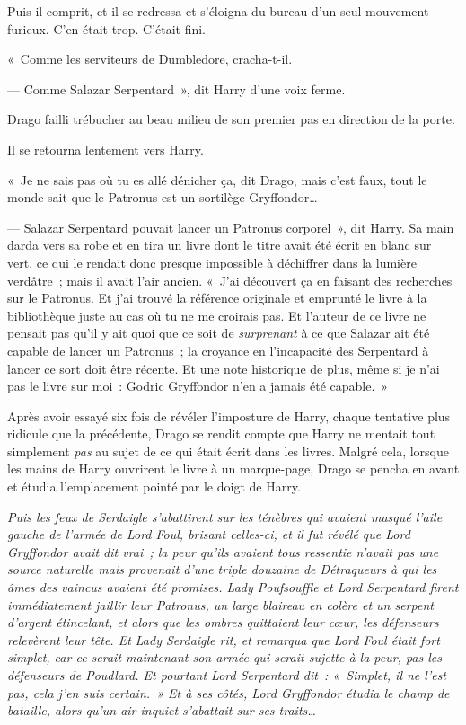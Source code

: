 Puis il comprit, et il se redressa et s'éloigna du bureau d'un seul mouvement furieux.
C'en était trop.
C'était fini.

«~Comme les serviteurs de Dumbledore, cracha-t-il.

--- Comme Salazar Serpentard~», dit Harry d'une voix ferme.

Drago failli trébucher au beau milieu de son premier pas en direction de la porte.

Il se retourna lentement vers Harry.

«~Je ne sais pas où tu es allé dénicher ça, dit Drago, mais c'est faux, tout le monde sait que le Patronus est un sortilège Gryffondor…

--- Salazar Serpentard pouvait lancer un Patronus corporel~», dit Harry.
Sa main darda vers sa robe et en tira un livre dont le titre avait été écrit en blanc sur vert, ce qui le rendait donc presque impossible à déchiffrer dans la lumière verdâtre~; mais il avait l'air ancien.
«~J'ai découvert ça en faisant des recherches sur le Patronus.
Et j'ai trouvé la référence originale et emprunté le livre à la bibliothèque juste au cas où tu ne me croirais pas.
Et l'auteur de ce livre ne pensait pas qu'il y ait quoi que ce soit de \emph{surprenant} à ce que Salazar ait été capable de lancer un Patronus~; la croyance en l'incapacité des Serpentard à lancer ce sort doit être récente.
Et une note historique de plus, même si je n'ai pas le livre sur moi~: Godric Gryffondor n'en a jamais été capable.~»

Après avoir essayé six fois de révéler l'imposture de Harry, chaque tentative plus ridicule que la précédente, Drago se rendit compte que Harry ne mentait tout simplement \emph{pas} au sujet de ce qui était écrit dans les livres.
Malgré cela, lorsque les mains de Harry ouvrirent le livre à un marque-page, Drago se pencha en avant et étudia l'emplacement pointé par le doigt de Harry.

\emph{Puis les feux de Serdaigle s'abattirent sur les ténèbres qui avaient masqué l'aile gauche de l'armée de Lord Foul, brisant celles-ci, et il fut révélé que Lord Gryffondor avait dit vrai~; la peur qu'ils avaient tous ressentie n'avait pas une source naturelle mais provenait d'une triple douzaine de Détraqueurs à qui les âmes des vaincus avaient été promises.
Lady Poufsouffle et Lord Serpentard firent immédiatement jaillir leur Patronus, un large blaireau en colère et un serpent d'argent étincelant, et alors que les ombres quittaient leur cœur, les défenseurs relevèrent leur tête.
Et Lady Serdaigle rit, et remarqua que Lord Foul était fort simplet, car ce serait maintenant son armée qui serait sujette à la peur, pas les défenseurs de Poudlard.
Et pourtant Lord Serpentard dit~: «~Simplet, il ne l'est pas, cela j'en suis certain.~»
Et à ses côtés, Lord Gryffondor étudia le champ de bataille, alors qu'un air inquiet s'abattait sur ses traits…}

